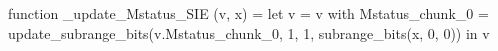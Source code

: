 function _update_Mstatus_SIE (v, x) = let v = { v with Mstatus_chunk_0 = update_subrange_bits(v.Mstatus_chunk_0, 1, 1, subrange_bits(x, 0, 0)) } in
  v
